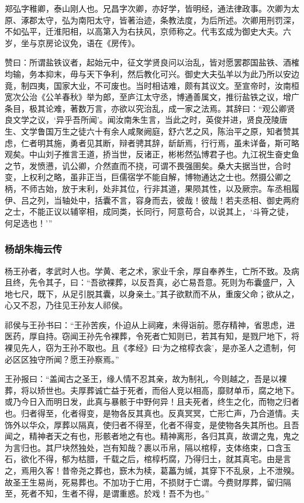 \documentclass[]{article}
\begin{document}
郑弘字稚卿，泰山刚人也。兄昌字次卿，亦好学，皆明经，通法律政事。次卿为太原、涿郡太守，弘为南阳太守，皆著治迹，条教法度，为后所述。次卿用刑罚深，不如弘平，迁淮阳相，以高第入为右扶风，京师称之。代韦玄成为御史大夫。六岁，坐与京房论议免，语在《房传》。

赞曰：所谓盐铁议者，起始元中，征文学贤良问以治乱，皆对愿罢郡国盐铁、酒榷均输，务本抑末，毋与天下争利，然后教化可兴。御史大夫弘羊以为此乃所以安边竟，制四夷，国家大业，不可废也。当时相诘难，颇有其议文。至宣帝时，汝南桓宽次公治《公羊春秋》举为郎，至庐江太守丞，博通善属文，推衍盐铁之议，增广条目，极其论难，著数万言，亦欲以究治乱，成一家之法焉。其辞曰：``观公卿贤良文学之议，`异乎吾所闻'。闻汝南朱生言，当此之时，英俊并进，贤良茂陵唐生、文学鲁国万生之徒六十有余人咸聚阙庭，舒六艺之风，陈治平之原，知者赞其虑，仁者明其施，勇者见其断，辩者骋其辞，龂龂焉，行行焉，虽未详备，斯可略观矣。中山刘子推言王道，挢当世，反诸正，彬彬然弘博君子也。九江祝生奋史鱼之节，发愤懑，讥公卿，介然直而不挠，可谓不畏强圉矣。桑大夫据当世，合时变，上权利之略，虽非正当，巨儒宿学不能自解，博物通达之士也。然摄公卿之柄，不师古始，放于末利，处非其位，行非其道，果陨其性，以及厥宗。车丞相履伊、吕之列，当轴处中，括囊不言，容身而去，彼哉！彼哉！若夫丞相、御史两府之士，不能正议以辅宰相，成同类，长同行，阿意苟合，以说其上，`斗筲之徒，何足选也！'''

\hypertarget{header-n5005}{%
\subsubsection{杨胡朱梅云传}\label{header-n5005}}

杨王孙者，孝武时人也。学黄、老之术，家业千余，厚自奉养生，亡所不致。及病且终，先令其子，曰：``吾欲裸葬，以反吾真，必亡易吾意。死则为布囊盛尸，入地七尺，既下，从足引脱其囊，以身亲土。''其子欲默而不从，重废父命；欲从之，心又不忍，乃往见王孙友人祁侯。

祁侯与王孙书曰：``王孙苦疾，仆迫从上祠雍，未得诣前。愿存精神，省思虑，进医药，厚自持。窃闻王孙先令裸葬，令死者亡知则已，若其有知，是戮尸地下，将裸见先人，窃为王孙不取也。且《孝经》曰`为之棺椁衣衾'，是亦圣人之遗制，何必区区独守所闻？愿王孙察焉。''

王孙报曰：``盖闻古之圣王，缘人情不忍其亲，故为制礼，今则越之，吾是以裸葬，将以矫世也。夫厚葬诚亡益于死者，而俗人竞以相高，靡财单币，腐之地下。或乃今日入而明日发，此真与暴骸于中野何异！且夫死者，终生之化，而物之归者也。归者得至，化者得变，是物各反其真也。反真冥冥，亡形亡声，乃合道情。夫饰外以华众，厚葬以隔真，使归者不得至，化者不得变，是使物各失其所也。且吾闻之，精神者天之有也，形骸者地之有也。精神离形，各归其真，故谓之鬼，鬼之为言归也。其尸块然独处，岂有知哉？裹以币帛，隔以棺椁，支体络束，口含玉石，欲化不得，郁为枯腊，千载之后，棺椁朽腐，乃得归土，就其真宅。由是言之，焉用久客！昔帝尧之葬也，窾木为椟，葛藟为缄，其穿下不乱泉，上不泄殠。故圣王生易尚，死易葬也。不加功于亡用，不损财于亡谓。今费财厚葬，留归隔至，死者不知，生者不得，是谓重惑。於戏！吾不为也。''
\end{document}
